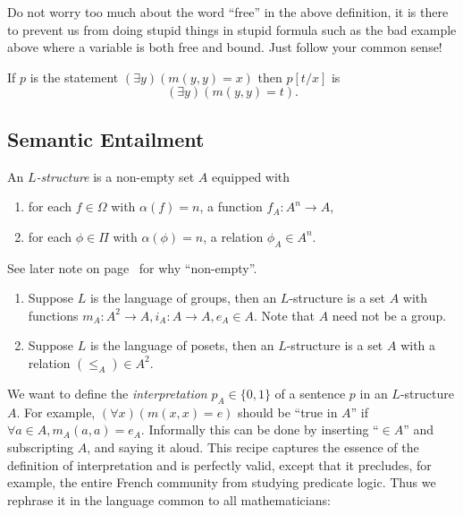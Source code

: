 \documentclass[a4paper]{article}
\begin{document}
Do not worry too much about the word ``free'' in the above definition, it is there to prevent us from doing stupid things in stupid formula such as the bad example above where a variable is both free and bound. Just follow your common sense!

\begin{eg}
  If \(p\) is the statement \((\exists y) (m(y, y) = x)\) then \(p[t/x]\) is
  \[
    (\exists y) (m(y, y) = t).
  \]
\end{eg}

\subsection{Semantic Entailment}

\begin{definition}[Structure]
  An \emph{\(L\)-structure} is a non-empty set \(A\) equipped with
  \begin{enumerate}
  \item for each \(f \in \Omega\) with \(\alpha(f) = n\), a function \(f_A: A^n \to A\),
  \item for each \(\phi \in \Pi\) with \(\alpha(\phi) = n\), a relation \(\phi_A \in A^n\).
  \end{enumerate}
\end{definition}

See later note on page~\pageref{note:empty structure} for why ``non-empty''.

\begin{eg}\leavevmode
  \begin{enumerate}
  \item Suppose \(L\) is the language of groups, then an \(L\)-structure is a set \(A\) with functions \(m_A: A^2 \to A, i_A: A \to A, e_A \in A\). Note that \(A\) need not be a group.
  \item Suppose \(L\) is the language of posets, then an \(L\)-structure is a set \(A\) with a relation \((\leq_A) \in A^2\).
  \end{enumerate}
\end{eg}

We want to define the \emph{interpretation} \(p_A \in \{0, 1\}\) of a sentence \(p\) in an \(L\)-structure \(A\). For example, \((\forall x) (m(x, x) = e)\) should be ``true in \(A\)'' if \(\forall a \in A, m_A(a, a) = e_A\). Informally this can be done by inserting ``\(\in A\)'' and subscripting \(A\), and saying it aloud. This recipe captures the essence of the definition of interpretation and is perfectly valid, except that it precludes, for example, the entire French community from studying predicate logic. Thus we rephrase it in the language common to all mathematicians:
\end{document}
